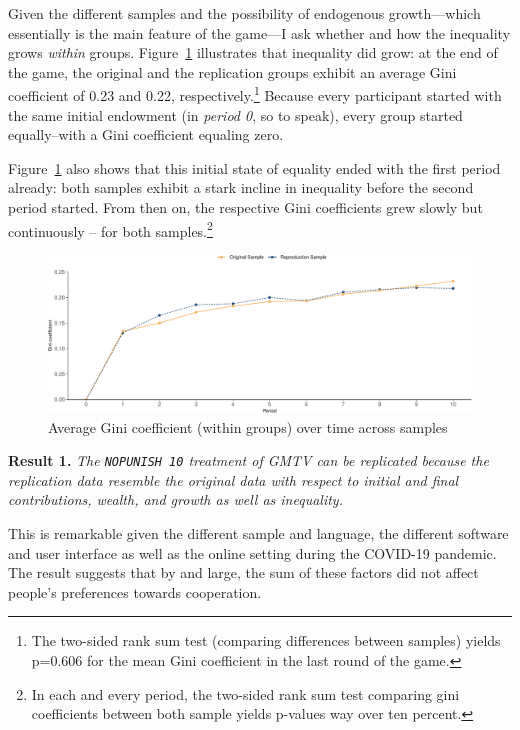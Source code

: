 \documentclass[
  authoryear,
  review,
  3p,
  onecolumn]{elsarticle}
\begin{document}
Given the different samples and the possibility of endogenous
growth---which essentially is the main feature of the game---I ask
whether and how the inequality grows \emph{within} groups.
Figure~\ref{fig-gini-time-series} illustrates that inequality did grow:
at the end of the game, the original and the replication groups exhibit
an average Gini coefficient of 0.23 and 0.22, respectively.\footnote{The
  two-sided rank sum test (comparing differences between samples) yields
  p=0.606 for the mean Gini coefficient in the last round of the game.}
Because every participant started with the same initial endowment (in
\emph{period 0}, so to speak), every group started equally--with a Gini
coefficient equaling zero.

Figure~\ref{fig-gini-time-series} also shows that this initial state of
equality ended with the first period already: both samples exhibit a
stark incline in inequality before the second period started. From then
on, the respective Gini coefficients grew slowly but continuously -- for
both samples.\footnote{In each and every period, the two-sided rank sum
  test comparing gini coefficients between both sample yields p-values
  way over ten percent.}

\begin{figure}

{\centering \includegraphics{paper_files/figure-pdf/fig-gini-time-series-1.pdf}

}

\caption{\label{fig-gini-time-series}Average Gini coefficient (within
groups) over time across samples}

\end{figure}

\textbf{Result 1.} \emph{The \texttt{NOPUNISH\ 10} treatment of GMTV can
be replicated because the replication data resemble the original data
with respect to initial and final contributions, wealth, and growth as
well as inequality.}

This is remarkable given the different sample and language, the
different software and user interface as well as the online setting
during the COVID-19 pandemic. The result suggests that by and large, the
sum of these factors did not affect people's preferences towards
cooperation.
\end{document}
